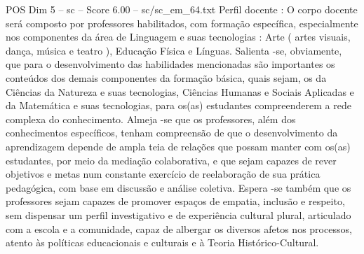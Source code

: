 \begin{textsample}{POS Dim 5 – sc – Score 6.00 – sc/sc\_em\_64.txt}
Perfil docente : O corpo docente será composto por professores habilitados, com formação específica, especialmente nos componentes da área de Linguagem e suas tecnologias : Arte ( artes visuais, dança, música e teatro ), Educação Física e Línguas.
Salienta -se, obviamente, que para o desenvolvimento das habilidades mencionadas são importantes os conteúdos dos demais componentes da formação básica, quais sejam, os da Ciências da Natureza e suas tecnologias, Ciências Humanas e Sociais Aplicadas e da Matemática e suas tecnologias, para os(as) estudantes compreenderem a rede complexa do conhecimento.
Almeja -se que os professores, além dos conhecimentos específicos, tenham compreensão de que o desenvolvimento da aprendizagem depende de ampla teia de relações que possam manter com os(as) estudantes, por meio da mediação colaborativa, e que sejam capazes de rever objetivos e metas num constante exercício de reelaboração de sua prática pedagógica, com base em discussão e análise coletiva.
Espera -se também que os professores sejam capazes de promover espaços de empatia, inclusão e respeito, sem dispensar um perfil investigativo e de experiência cultural plural, articulado com a escola e a comunidade, capaz de albergar os diversos afetos nos processos, atento às políticas educacionais e culturais e à Teoria Histórico-Cultural.

\end{textsample}
